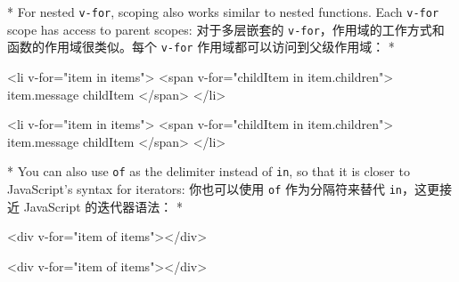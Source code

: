 \begin{paracol}{2}
\switchcolumn[0]*%
For nested \texttt{v-for}, scoping also works similar to nested
functions. Each \texttt{v-for} scope has access to parent scopes:
\switchcolumn
对于多层嵌套的
\texttt{v-for}，作用域的工作方式和函数的作用域很类似。每个
\texttt{v-for} 作用域都可以访问到父级作用域：
\switchcolumn[0]*%
\begin{codeHtml}
<li v-for="item in items">
  <span v-for="childItem in item.children">
    {{ item.message }} {{ childItem }}
  </span>
</li>
\end{codeHtml}
\switchcolumn
\begin{codeHtml}
<li v-for="item in items">
  <span v-for="childItem in item.children">
    {{ item.message }} {{ childItem }}
  </span>
</li>
\end{codeHtml}
\switchcolumn[0]*%
You can also use \texttt{of} as the delimiter instead of \texttt{in}, so
that it is closer to JavaScript's syntax for iterators:
\switchcolumn
你也可以使用 \texttt{of} 作为分隔符来替代 \texttt{in}，这更接近
JavaScript 的迭代器语法：
\switchcolumn[0]*%
\begin{codeHtml}
<div v-for="item of items"></div>
\end{codeHtml}
\switchcolumn
\begin{codeHtml}
<div v-for="item of items"></div>
\end{codeHtml}
\end{paracol}

